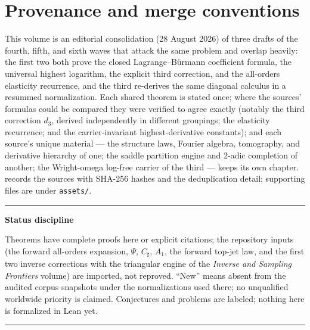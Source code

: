 \documentclass[11pt,oneside]{article}
\numberwithin{equation}{section}
\theoremstyle{definition}
\theoremstyle{remark}
\newcommand{\Csharp}{C_{\sharp}}
\newenvironment{statusbox}[1]{%
  \par\smallskip\noindent\begin{center}\begin{minipage}{0.94\textwidth}%
  \hrule\vspace{0.5em}\noindent\textbf{#1}\par\smallskip
}{%
  \vspace{0.5em}\hrule\end{minipage}\end{center}\smallskip
}
\begin{document}
\begin{abstract}
Finally, a Wright-omega \emph{resummation} of the carrier absorbs the
entire nonperiodic quadratic--linear--constant--logarithmic phase:
with $w$ defined through
$\omega\bigl(4(T+\Csharp+L\beta^{2}/2)+\log 2L\bigr)$, the expansion
$G/G_W\sim1+\sum g_m(w+\beta)w^{-m}$ has \emph{bounded periodic
coefficients with no logarithms at any order}, a clean
$w^{-N-1}$ remainder, the strikingly simple low orders
$g_1=-\Psi$ and $h_2=\tfrac5{24}+\cdots$, a convergent bare-skeleton
reversion (inversion is not the source of divergence), a conditional
Gevrey-one transfer theorem, and third-order accuracy
$1.1\times10^{-9}$ at $n=160$ on the exact dyadic quantiles ---
$43$ times better than the third $\rho$-order.  Provenance of the
absorbed sources, with SHA-256 hashes and the cross-validation
record, is in \cref{sec:provenance-inv}.
\end{abstract}

\clearpage
\tableofcontents
\clearpage

\section*{Provenance and merge conventions}

This volume is an editorial consolidation (28 August 2026) of three
drafts of the fourth, fifth, and sixth waves that attack the same
problem and overlap heavily: the first two both prove the closed
Lagrange--B\"urmann coefficient formula, the universal highest
logarithm, the explicit third correction, and the all-orders
elasticity recurrence, and the third re-derives the same diagonal
calculus in a resummed normalization.  Each shared theorem is stated
once; where the sources' formulas could be compared they were
verified to agree exactly (notably the third correction $d_3$,
derived independently in different groupings; the elasticity
recurrence; and the carrier-invariant highest-derivative constants);
and each source's unique material --- the structure laws, Fourier
algebra, tomography, and derivative hierarchy of one; the saddle
partition engine and $2$-adic completion of another; the
Wright-omega log-free carrier of the third --- keeps its own
chapter.
 records the sources with SHA-256 hashes and
the deduplication detail; supporting files are under
\nolinkurl{assets/}.

\begin{statusbox}{Status discipline}
Theorems have complete proofs here or explicit citations; the
repository inputs (the forward all-orders expansion, $\Psi$,
$\Csharp$, $A_1$, the forward top-jet law, and the first two inverse
corrections with the triangular engine of the
\emph{Inverse and Sampling Frontiers} volume) are imported, not
reproved.  ``New'' means absent from the audited corpus snapshots
under the normalizations used there; no unqualified worldwide
priority is claimed.  Conjectures and problems are labeled; nothing
here is formalized in Lean yet.
\end{statusbox}
\end{document}
